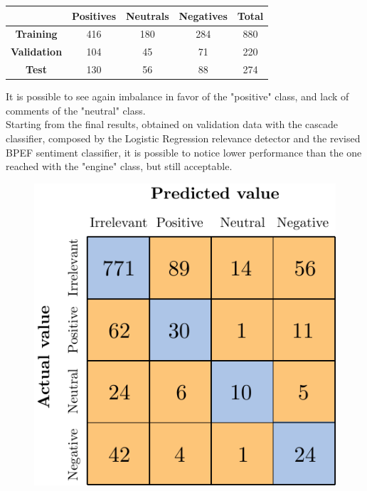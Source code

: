 \begin{center}
	\begin{tabular}{ | c  c  c c | c | } 
		\hline
		& \textbf{Positives} & \textbf{Neutrals} & \textbf{Negatives} & \textbf{Total} \\
		\hline
		\textbf{Training} & 416 & 180 & 284 & 880 \\ 
		\hline
		\textbf{Validation} & 104 & 45 & 71 & 220 \\ 
		\hline
		\textbf{Test} & 130 & 56 & 88 & 274 \\
		\hline
	\end{tabular}
\end{center}

It is possible to see again imbalance in favor of the "positive" class, and lack of comments of the "neutral" class.\\
Starting from the final results, obtained on validation data with the cascade classifier, composed by the Logistic Regression relevance detector and the revised BPEF sentiment classifier, it is possible to notice lower performance than the one reached with the "engine" class, but still acceptable.


\begin{figure}[H]
	\centering
	\includegraphics[scale=1]{figures/conf_matrices/ita_brand/ita_cascade_brand_bpef_val.pdf}
	\label{fig:ita_cascade_brand_bpef_val}
\end{figure}


